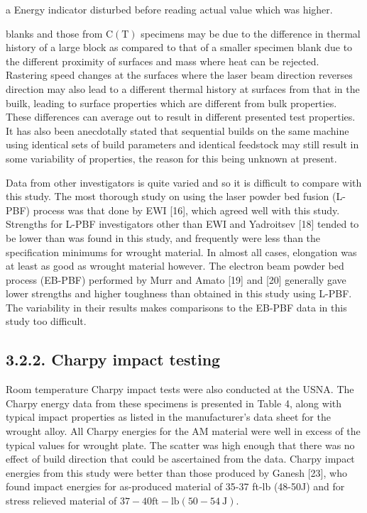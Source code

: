 \documentclass[10pt]{article}
\begin{document}
a Energy indicator disturbed before reading actual value which was higher.

blanks and those from $\mathrm{C}(\mathrm{T})$ specimens may be due to the difference in thermal history of a large block as compared to that of a smaller specimen blank due to the different proximity of surfaces and mass where heat can be rejected. Rastering speed changes at the surfaces where the laser beam direction reverses direction may also lead to a different thermal history at surfaces from that in the builk, leading to surface properties which are different from bulk properties. These differences can average out to result in different presented test properties. It has also been anecdotally stated that sequential builds on the same machine using identical sets of build parameters and identical feedstock may still result in some variability of properties, the reason for this being unknown at present.

Data from other investigators is quite varied and so it is difficult to compare with this study. The most thorough study on using the laser powder bed fusion (L-PBF) process was that done by EWI [16], which agreed well with this study. Strengths for L-PBF investigators other than EWI and Yadroitsev [18] tended to be lower than was found in this study, and frequently were less than the specification minimums for wrought material. In almost all cases, elongation was at least as good as wrought material however. The electron beam powder bed process (EB-PBF) performed by Murr and Amato [19] and [20] generally gave lower strengths and higher toughness than obtained in this study using L-PBF. The variability in their results makes comparisons to the EB-PBF data in this study too difficult.

\subsection*{3.2.2. Charpy impact testing}
Room temperature Charpy impact tests were also conducted at the USNA. The Charpy energy data from these specimens is presented in Table 4, along with typical impact properties as listed in the manufacturer's data sheet for the wrought alloy. All Charpy energies for the AM material were well in excess of the typical values for wrought plate. The scatter was high enough that there was no effect of build direction that could be ascertained from the data. Charpy impact energies from this study were better than those produced by Ganesh [23], who found impact energies for as-produced material of 35-37 ft-lb (48-50J) and for stress relieved material of $37-40 \mathrm{ft}-\mathrm{lb}(50-54 \mathrm{~J})$.
\end{document}
